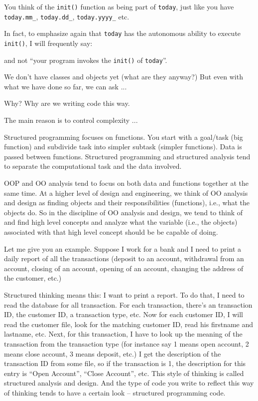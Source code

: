 You think of the \texttt{init()} function as being part of \texttt{today}, just like you
have \texttt{today.mm\_}, \texttt{today.dd\_}, \texttt{today.yyyy\_} etc.

In fact, to emphasize again that \texttt{today} has the autonomous ability
to execute \texttt{init()}, I will frequently say:


and not ``your program invokes the \texttt{init()} of \texttt{today}''.







\newpage{}

We don't have classes and objects yet (what are they
anyway?) But even with what we have done so far, we can ask ...

Why? Why are we writing code this way.

The main reason is to control complexity ...

Structured programming focuses on functions. You start with a goal/task
(big function) and subdivide task into simpler subtask (simpler
functions). Data is passed between functions. Structured programming and structured
analysis tend to separate the computational task and the data involved.

OOP and OO analysis tend to focus on both data and functions together at
the same time. At a higher level of design and engineering, we think of
OO analysis and design as finding objects and their responsibilities
(functions), i.e., what the objects do. So in the discipline of OO
analysis and design, we tend to think of and find high level concepts
and analyze what the variable (i.e., the objects) associated with that
high level concept should be be capable of doing.

Let me give you an example.
Suppose I work for a bank and I need to print a daily report of all the
transactions (deposit to an account, withdrawal from an account, closing
of an account, opening of an account, changing the address of the
customer, etc.)

Structured thinking means this: I want to print a report. To do that, I need
to read the database for all transaction. For each transaction, there's an
transaction ID, the customer ID, a transaction type, etc. Now for each
customer ID, I will read the customer file, look for the matching customer
ID, read his firstname and lastname, etc. Next, for this transaction, I have
to look up the meaning of the transaction from the transaction type (for
instance say 1 means open account, 2 means close account, 3 means
deposit, etc.) I get the description of the transaction ID from some file, so
if the transaction is 1, the description for this entry is “Open Account”,
“Close Account”, etc. This style of thinking is called structured analysis
and design. And the type of code you write to reflect this way of thinking
tends to have a certain look – structured programming code.


